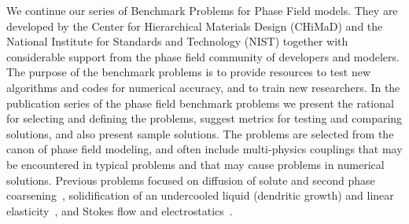 \documentclass[preprint,12pt]{elsarticle}
\begin{document}
We continue our series of Benchmark Problems for Phase Field models. They are developed by the Center for Hierarchical Materials Design (CHiMaD) and the National Institute for Standards and Technology (NIST) together with considerable support from the phase field community of developers and modelers. The purpose of the benchmark problems is to provide resources to test new algorithms and codes for numerical accuracy, and to train new researchers. In the publication series of the phase field benchmark problems we present the rational for selecting and defining the problems, suggest metrics for testing and comparing solutions, and also present sample solutions. The problems are selected from the canon of phase field modeling, and often include multi-physics couplings that may be encountered in typical problems and that may cause problems in numerical solutions. Previous problems focused on diffusion of solute and second phase coarsening~\cite{jokisaari2017spinodal}, solidification of an undercooled liquid (dendritic growth) and linear elasticity~\cite{jokisaari2017dendrite}, and Stokes flow and electrostatics~\cite{jokisaari2020stokes}. %
\end{document}
